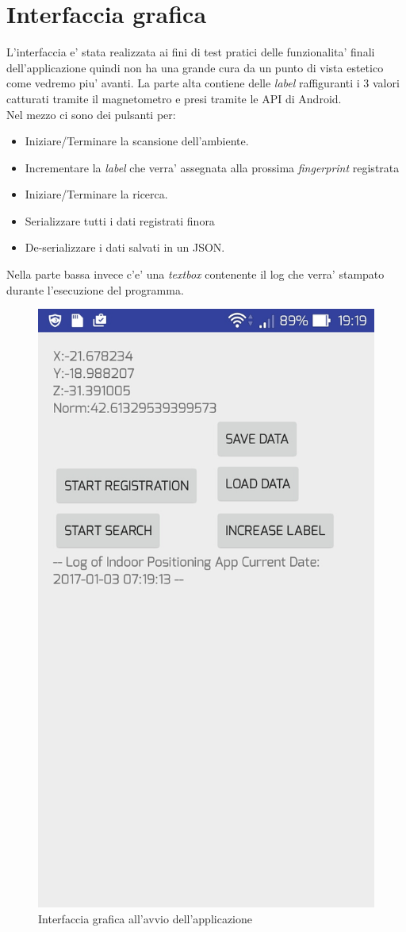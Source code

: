 \section{Interfaccia grafica}
L'interfaccia e' stata realizzata ai fini di test pratici delle funzionalita' finali dell'applicazione quindi non ha una grande cura da un punto di vista estetico come vedremo piu' avanti.
La parte alta contiene delle \textit{label} raffiguranti i 3 valori catturati tramite il magnetometro e presi tramite le API di Android. \\
Nel mezzo ci sono dei pulsanti per:
\begin{itemize}
	\item Iniziare/Terminare la scansione dell'ambiente.
	\item Incrementare la \textit{label} che verra' assegnata alla prossima \textit{fingerprint} registrata
	\item Iniziare/Terminare la ricerca.
	\item Serializzare tutti i dati registrati finora
	\item De-serializzare i dati salvati in un JSON.
\end{itemize}
Nella parte bassa invece c'e' una \textit{textbox} contenente il log che verra' stampato durante l'esecuzione del programma.

\begin{figure}[H]
\centering
\includegraphics[width=0.3\linewidth]{img/app_screen}
\caption{Interfaccia grafica all'avvio dell'applicazione}
\label{fig:app_screen}
\end{figure}

